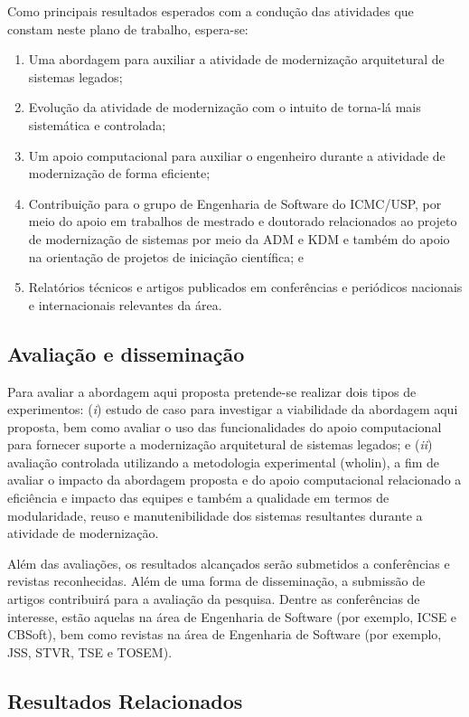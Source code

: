 \documentclass[12pt]{article}
\begin{document}
Como principais resultados esperados com a condução das atividades que constam neste plano de trabalho, espera-se:

\begin{enumerate}
\item Uma abordagem para auxiliar a atividade de modernização arquitetural de sistemas legados;
\item Evolução da atividade de modernização com o intuito de torna-lá mais sistemática e controlada;
\item Um apoio computacional para auxiliar o engenheiro durante a atividade de modernização de forma eficiente;
\item Contribuição para o grupo de Engenharia de Software do ICMC/USP, por meio do apoio em trabalhos de mestrado e doutorado relacionados ao projeto de modernização de sistemas por meio da ADM e KDM e também do apoio na orientação de projetos de iniciação científica; e
\item Relatórios técnicos e artigos publicados em conferências e periódicos nacionais e internacionais relevantes da área.
\end{enumerate}

\subsection{Avaliação e disseminação}

Para avaliar a abordagem aqui proposta pretende-se realizar dois tipos de experimentos: (\textit{i}) estudo de caso para investigar a viabilidade da abordagem aqui proposta, bem como avaliar o uso das funcionalidades do apoio computacional para fornecer suporte a modernização arquitetural de sistemas legados; e (\textit{ii}) avaliação controlada utilizando a metodologia experimental (wholin), a fim de avaliar o impacto da abordagem proposta e do apoio computacional relacionado a eficiência e impacto das equipes e também a qualidade em termos de modularidade, reuso e manutenibilidade dos sistemas resultantes durante a atividade de modernização.

Além das avaliações, os resultados alcançados serão submetidos a conferências e revistas reconhecidas. Além de uma forma de disseminação, a submissão de artigos contribuirá para a avaliação da pesquisa. Dentre as conferências de interesse, estão aquelas na área de Engenharia de Software (por exemplo, ICSE e CBSoft), bem como revistas na área de Engenharia de Software (por exemplo, JSS, STVR, TSE e TOSEM).

\subsection{Resultados Relacionados}
\end{document}
